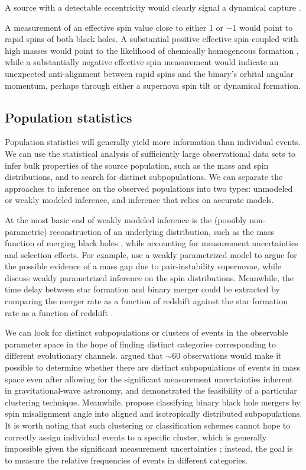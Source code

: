 \documentclass[iop,onecolumn]{revtex4}
\begin{document}
A source with a detectable eccentricity would clearly signal a dynamical capture \citep{Breivik:2016}. 

A measurement of an effective spin value close to either 1 or $-1$ would point to rapid spins of both black holes. A substantial positive effective spin coupled with high masses would point to the likelihood of chemically homogeneous formation \citep{Marchant:2016}, while a substantially negative effective spin measurement would indicate an unexpected anti-alignment between rapid spins and the binary's orbital angular momentum, perhaps through either a supernova spin tilt or dynamical formation.  

\subsection{Population statistics}

Population statistics will generally yield more information than individual events.  We can use the statistical analysis of sufficiently large observational data sets to infer bulk properties of the source population, such as the mass and spin distributions, and to search for distinct subpopulations.  We can separate the approaches to inference on the observed populations into two types: unmodeled or weakly modeled inference, and inference that relies on accurate models. 

At the most basic end of weakly modeled inference is the (possibly non-parametric) reconstruction of an underlying distribution, such as the mass function of merging black holes \citep{Mandel:2010stat,BBH:O1}, while accounting for measurement uncertainties and selection effects.  For example, \citet{Fishbach:2017mass} use a weakly parametrized model to argue for the possible evidence of a mass gap due to pair-instability supernovae, while \citet{TalbotThrane:2017} discuss weakly parametrized inference on the spin distributions.  Meanwhile, the time delay between star formation and binary merger could be extracted by comparing the merger rate as a function of redshift against the star formation rate as a function of redshift \citep{Mandel:2016select}.  

We can look for distinct subpopulations or clusters of events in the observable parameter space in the hope of finding distinct categories corresponding to different evolutionary channels.  \citet{Mandel:2015} argued that $\sim 60$ observations would make it possible to determine whether there are distinct subpopulations of events in mass space even after allowing for the significant measurement uncertainties inherent in gravitational-wave astronomy, and \citet{Mandel:2016cluster} demonstrated the feasibility of a particular clustering technique.  Meanwhile, \citet{Farr:2018} propose classifying binary black hole mergers by spin misalignment angle into aligned and isotropically distributed subpopulations.  It is worth noting that such clustering or classification schemes cannot hope to correctly assign individual events to a specific cluster, which is generally impossible given the significant measurement uncertainties \citep{Littenberg:2015}; instead, the goal is to measure the relative frequencies of events in different categories.
\end{document}
